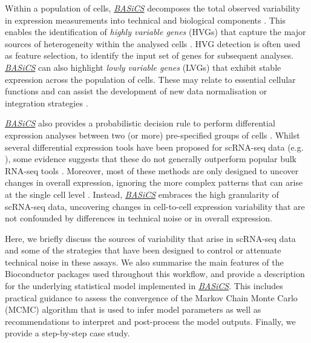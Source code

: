 \documentclass[9pt,a4paper,]{extarticle}
\begin{document}
Within a population of cells, \emph{\href{https://bioconductor.org/packages/3.11/BASiCS}{BASiCS}} decomposes the total
observed variability in expression measurements into technical and biological
components \citep{Vallejos2015}.
This enables the identification of \emph{highly variable genes} (HVGs) that capture
the major sources of heterogeneity within the analysed cells \citep{Brennecke2013}.
HVG detection is often used as feature selection, to identify the input
set of genes for subsequent analyses.
\emph{\href{https://bioconductor.org/packages/3.11/BASiCS}{BASiCS}} can also highlight \emph{lowly variable genes} (LVGs) that
exhibit stable expression across the population of cells.
These may relate to essential cellular functions and can assist the development
of new data normalisation or integration strategies \citep{Lin2019}.

\emph{\href{https://bioconductor.org/packages/3.11/BASiCS}{BASiCS}} also provides a probabilistic decision rule to
perform differential expression analyses between two (or more) pre-specified
groups of cells \citep{Vallejos2016, Eling2018}.
Whilst several differential expression tools have been proposed for scRNA-seq
data (e.g. \citep{Kharchenko2014, Finak2015}), some evidence suggests that
these do not generally outperform popular bulk RNA-seq tools \citep{Soneson2018}.
Moreover, most of these methods are only designed to uncover changes in overall
expression, ignoring the more complex patterns that can arise at the single cell
level \citep{Lahnemann2020}.
Instead, \emph{\href{https://bioconductor.org/packages/3.11/BASiCS}{BASiCS}} embraces the high granularity of scRNA-seq data,
uncovering changes in cell-to-cell expression variability that are not
confounded by differences in technical noise or in overall expression.

Here, we briefly discuss the sources of variability that arise in scRNA-seq data
and some of the strategies that have been designed to control or attenuate
technical noise in these assays.
We also summarise the main features of the Bioconductor packages used
throughout this workflow, and provide a description for the underlying
statistical model implemented in \emph{\href{https://bioconductor.org/packages/3.11/BASiCS}{BASiCS}}.
This includes practical guidance to assess the convergence of the Markov Chain
Monte Carlo (MCMC) algorithm that is used to infer model parameters as well as
recommendations to interpret and post-process the model outputs.
Finally, we provide a step-by-step case study.
\end{document}
